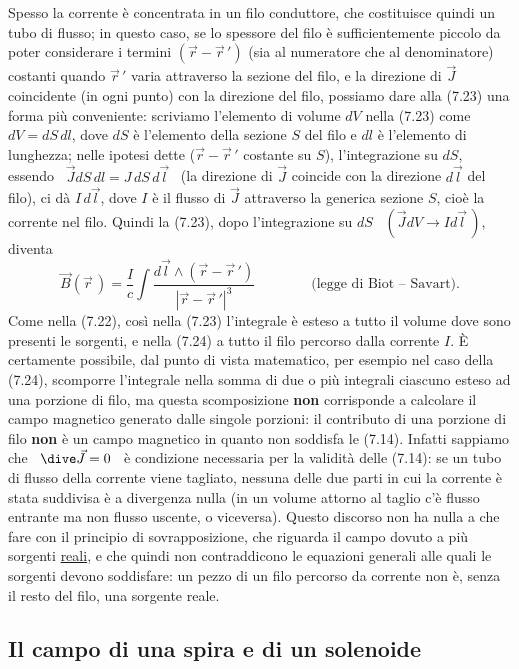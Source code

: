 Spesso la corrente \`e concentrata in un filo conduttore, che costituisce quindi
un tubo di flusso; in questo caso, se lo spessore del filo \`e sufficientemente
piccolo da poter considerare i termini $(\vec r-\vec r\,')$ (sia al numeratore
che al denominatore) costanti quando $\vec r\,'$ varia attraverso la sezione del
filo, e la direzione di $\vec J$ coincidente (in ogni punto) con la direzione
del filo, possiamo dare alla (7.23) una forma pi\`u conveniente: scriviamo
l'elemento di volume $dV$ nella (7.23) come \ $dV=dS\,dl$, dove $dS$ \`e
l'elemento della sezione $S$ del filo e $dl$ \`e l'elemento di lunghezza; nelle
ipotesi dette ($\vec r-\vec r\,'$ costante su $S$), l'integrazione su $dS$,
essendo \ $\vec J dS\,dl=J\,dS\,d\vec l$ \ (la direzione di $\vec J$ coincide
con la direzione $d\vec l$ del filo), ci d\`a $I\,d\vec l$, dove $I$ \`e il
flusso di $\vec J$ attraverso la generica sezione $S$, cio\`e la corrente nel
filo. Quindi la (7.23), dopo l'integrazione su $dS$
\ $(\vec J dV\to I d\vec l\,)$, diventa
\begin{equation}
  \vec B(\vec r\,)
  =\frac{I}{c}\int\frac{d\vec l\wedge(\vec r-\vec r\,')}{|\vec r-\vec r\,'|^3}
  \qquad\qquad\text{(legge di Biot -- Savart).}
  \tag{7.24}
\end{equation}
Come nella (7.22), cos\`i nella (7.23) l'integrale \`e esteso a tutto il volume
dove sono presenti le sorgenti, e nella (7.24) a tutto il filo percorso dalla
corrente $I$. \`E certamente possibile, dal punto di vista matematico, per
esempio nel caso della (7.24), scomporre l'integrale nella somma di due o pi\`u
integrali ciascuno esteso ad una porzione di filo, ma questa scomposizione
\textbf{non} corrisponde a calcolare il campo magnetico generato dalle singole
porzioni: il contributo di una porzione di filo \textbf{non} \`e un campo
magnetico in quanto non soddisfa le (7.14). Infatti sappiamo che
\ $\dive\vec J=0$ \ \`e condizione necessaria per la validit\`a delle (7.14): se
un tubo di flusso della corrente viene tagliato, nessuna delle due parti in cui
la corrente \`e stata suddivisa \`e a divergenza nulla (in un volume attorno al
taglio c'\`e flusso entrante ma non flusso uscente, o viceversa). Questo
discorso non ha nulla a che fare con il principio di sovrapposizione, che
riguarda il campo dovuto a pi\`u sorgenti \underline{reali}, e che quindi non
contraddicono le equazioni generali alle quali le sorgenti devono soddisfare: un
pezzo di un filo percorso da corrente non \`e, senza il resto del filo, una
sorgente reale.

\subsection{Il campo di una spira e di un solenoide}

